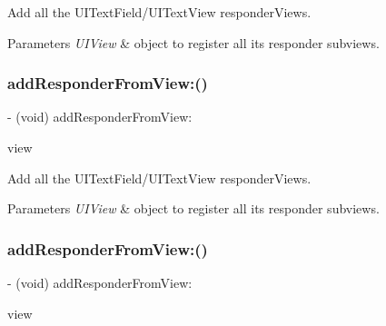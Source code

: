 Add all the U\+I\+Text\+Field/\+U\+I\+Text\+View responder\+View\textquotesingle{}s.


\begin{DoxyParams}{Parameters}
{\em U\+I\+View} & object to register all it\textquotesingle{}s responder subviews. \\
\hline
\end{DoxyParams}
\mbox{\label{interface_i_q_keyboard_return_key_handler_ad6961c2e42c5964dc8a707ce844f26ad}} 
\subsubsection{\texorpdfstring{add\+Responder\+From\+View\+:()}{addResponderFromView:()}\hspace{0.1cm}{\footnotesize\ttfamily [2/3]}}
{\footnotesize\ttfamily -\/ (void) add\+Responder\+From\+View\+: \begin{DoxyParamCaption}\item[{(nonnull U\+I\+View $\ast$)}]{view }\end{DoxyParamCaption}}

Add all the U\+I\+Text\+Field/\+U\+I\+Text\+View responder\+View\textquotesingle{}s.


\begin{DoxyParams}{Parameters}
{\em U\+I\+View} & object to register all it\textquotesingle{}s responder subviews. \\
\hline
\end{DoxyParams}
\mbox{\label{interface_i_q_keyboard_return_key_handler_ad6961c2e42c5964dc8a707ce844f26ad}} 
\subsubsection{\texorpdfstring{add\+Responder\+From\+View\+:()}{addResponderFromView:()}\hspace{0.1cm}{\footnotesize\ttfamily [3/3]}}
{\footnotesize\ttfamily -\/ (void) add\+Responder\+From\+View\+: \begin{DoxyParamCaption}\item[{(nonnull U\+I\+View $\ast$)}]{view }\end{DoxyParamCaption}}

